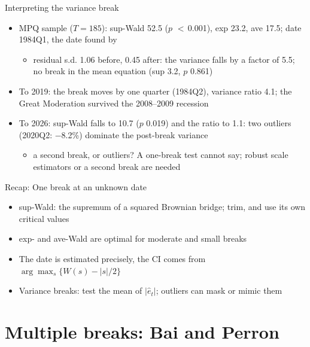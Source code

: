 \begin{frame}{Interpreting the variance break}
\itemsize{\small}
\begin{itemize}
    \item MPQ sample ($T = 185$): sup-Wald 52.5 ($p$ $<$\,0.001), exp 23.2, ave 17.5; date 1984Q1, the date found by 
    \begin{itemize}
        \item residual s.d. 1.06 before, 0.45 after: the variance falls by a factor of 5.5; no break in the mean equation (sup 3.2, $p$ 0.861)
    \end{itemize}
    \item To 2019: the break moves by one quarter (1984Q2), variance ratio 4.1; the Great Moderation survived the 2008--2009 recession
    \item To 2026: sup-Wald falls to 10.7 ($p$ 0.019) and the ratio to 1.1: two outliers (2020Q2: \ensuremath{-}8.2\%) dominate the post-break variance
    \begin{itemize}
        \item a second break, or outliers? A one-break test cannot say; robust scale estimators or a second break are needed
    \end{itemize}
\end{itemize}
\end{frame}

\begin{frame}{Recap: One break at an unknown date}
\itemsize{\small}
\begin{itemize}
    \item sup-Wald: the supremum of a squared Brownian bridge; trim, and use its own critical values
    \item exp- and ave-Wald are optimal for moderate and small breaks
    \item The date is estimated precisely, the CI comes from $\arg\max_s\{W(s) - |s|/2\}$
    \item Variance breaks: test the mean of $|\hat e_t|$; outliers can mask or mimic them
\end{itemize}
\end{frame}


\section{Multiple breaks: Bai and Perron}

